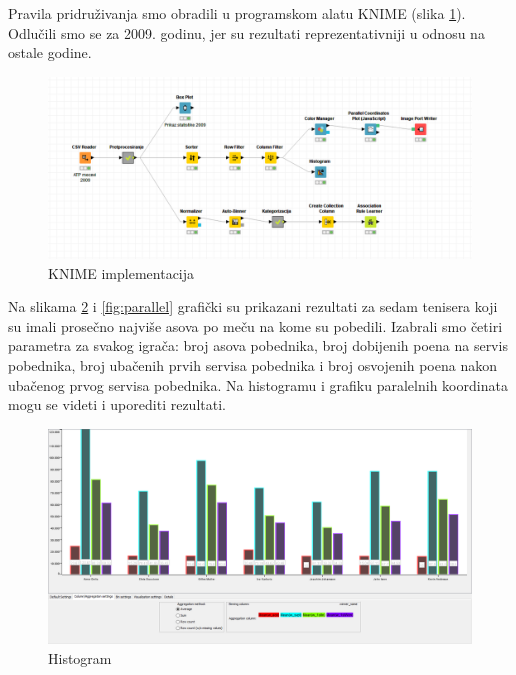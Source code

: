 \documentclass[a4paper]{article}
\begin{document}
Pravila pridruživanja smo obradili u programskom alatu KNIME (slika \ref{fig:knime}).
Odlučili smo se za 2009. godinu, jer su rezultati reprezentativniji u odnosu na ostale godine.

\begin{figure}[H]
	\begin{center}
		\includegraphics[width=1\textwidth]{PravilaPridruzivanja/knime.png}
	\end{center}
	\caption{KNIME implementacija}
	\label{fig:knime}
\end{figure}

Na slikama \ref{fig:histogram} i \ref{fig:parallel} grafički su prikazani rezultati za sedam
tenisera koji su imali prosečno najviše asova po meču na kome su pobedili. Izabrali smo četiri parametra za svakog igrača:
broj asova pobednika, broj dobijenih poena na servis pobednika, broj ubačenih prvih servisa pobednika i
broj osvojenih poena nakon ubačenog prvog servisa pobednika. Na histogramu i grafiku paralelnih koordinata 
mogu se videti i uporediti rezultati.

\begin{figure}[H]
	\begin{center}
		\includegraphics[width=1\textwidth]{PravilaPridruzivanja/histogram2009}
	\end{center}
	\caption{Histogram}
	\label{fig:histogram}
\end{figure}
\end{document}
